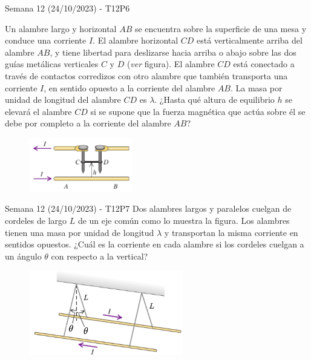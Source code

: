 \begin{frame}{Semana 12 (24/10/2023) - T12P6}

    Un alambre largo y horizontal $AB$ se encuentra sobre la
superficie de una mesa y conduce
una corriente $I$. El alambre horizontal $CD$ está verticalmente
arriba del alambre $AB$, y tiene
libertad para deslizarse hacia
arriba o abajo sobre las dos guías metálicas verticales $C$ y $D$ (\textit{ver} figura). El alambre $CD$ está conectado a través de contactos corredizos con otro alambre que también transporta una corriente $I$, en sentido
opuesto a la corriente del alambre $AB$. La masa por unidad de longitud
del alambre $CD$ es $\lambda$. ¿Hasta qué altura de equilibrio $h$ se elevará el
alambre $CD$ si se supone que la fuerza magnética que actúa sobre él se
debe por completo a la corriente del alambre $AB$?

\begin{figure}
    \centering
    \includegraphics[width=0.4\textwidth]{figures/t13p6.png}
\end{figure}

\end{frame}

\begin{frame}{Semana 12 (24/10/2023) - T12P7}
    Dos alambres largos y paralelos cuelgan de cordeles de
largo $L$ de un eje común como lo muestra la figura. Los alambres tienen
una masa por unidad de longitud $\lambda$ y transportan la misma
corriente en sentidos opuestos. ¿Cuál es la corriente en cada alambre si
los cordeles cuelgan a un ángulo $\theta$ con respecto a la vertical?
    
    \begin{figure}
        \centering
        \includegraphics[width=0.6\textwidth]{figures/Q9.png}
    \end{figure}
\end{frame}


